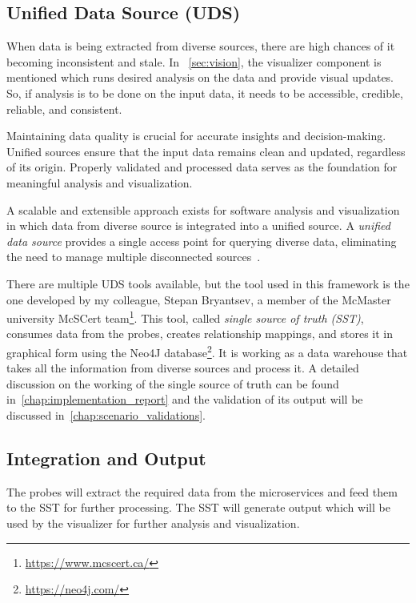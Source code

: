 \subsection{Unified Data Source (UDS)}\label{sec:component-sst}

When data is being extracted from diverse sources, there are high chances of it becoming inconsistent and stale. In ~\autoref{sec:vision}, the visualizer component is mentioned which runs desired analysis on the data and provide visual updates. So, if analysis is to be done on the input data, it needs to be accessible, credible, reliable, and consistent.

Maintaining data quality is crucial for accurate insights and decision-making. Unified sources ensure that the input data remains clean and updated, regardless of its origin. Properly validated and processed data serves as the foundation for meaningful analysis and visualization.

A scalable and extensible approach exists for software analysis and visualization in which data from diverse source is integrated into a unified source. A \textit{unified data source} provides a single access point for querying diverse data, eliminating the need to manage multiple disconnected sources~\citep{MullerUdsforSA2018}.

There are multiple UDS tools available, but the tool used in this framework is the one developed by my colleague, Stepan Bryantsev, a member of the McMaster university McSCert team\footnote{\url{https://www.mcscert.ca/}}. This tool, called \textit{single source of truth (SST)}, consumes data from the probes, creates relationship mappings, and stores it in graphical form using the Neo4J database\footnote{\url{https://neo4j.com/}}. It is working as a data warehouse that takes all the information from diverse sources and process it. A detailed discussion on the working of the single source of truth can be found in~\autoref{chap:implementation_report} and the validation of its output will be discussed in~\autoref{chap:scenario_validations}.

\subsection{Integration and Output}

The probes will extract the required data from the microservices and feed them to the SST for further processing. The SST will generate output which will be used by the visualizer for further analysis and visualization.

